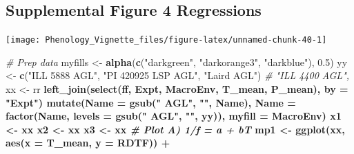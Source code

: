 \documentclass[
]{article}
\newenvironment{Shaded}{\begin{snugshade}}{\end{snugshade}}
\newcommand{\CommentTok}[1]{\textcolor[rgb]{0.56,0.35,0.01}{\textit{#1}}}
\newcommand{\DataTypeTok}[1]{\textcolor[rgb]{0.13,0.29,0.53}{#1}}
\newcommand{\FloatTok}[1]{\textcolor[rgb]{0.00,0.00,0.81}{#1}}
\newcommand{\KeywordTok}[1]{\textcolor[rgb]{0.13,0.29,0.53}{\textbf{#1}}}
\newcommand{\NormalTok}[1]{#1}
\newcommand{\OperatorTok}[1]{\textcolor[rgb]{0.81,0.36,0.00}{\textbf{#1}}}
\newcommand{\StringTok}[1]{\textcolor[rgb]{0.31,0.60,0.02}{#1}}
\begin{document}
\hypertarget{supplemental-figure-4-regressions}{%
\subsection{Supplemental Figure 4
Regressions}\label{supplemental-figure-4-regressions}}

\texttt{[image: Phenology\_Vignette\_files/figure-latex/unnamed-chunk-40-1]}

\begin{Shaded}
\begin{Highlighting}[]
\CommentTok{# Prep data}
\NormalTok{myfills <-}\StringTok{ }\KeywordTok{alpha}\NormalTok{(}\KeywordTok{c}\NormalTok{(}\StringTok{"darkgreen"}\NormalTok{, }\StringTok{"darkorange3"}\NormalTok{, }\StringTok{"darkblue"}\NormalTok{), }\FloatTok{0.5}\NormalTok{)}
\NormalTok{yy <-}\StringTok{ }\KeywordTok{c}\NormalTok{(}\StringTok{"ILL 5888 AGL"}\NormalTok{, }\StringTok{"PI 420925 LSP AGL"}\NormalTok{,  }\StringTok{"Laird AGL"}\NormalTok{) }\CommentTok{# "ILL 4400 AGL",}
\NormalTok{xx <-}\StringTok{ }\NormalTok{rr }\OperatorTok{%
\StringTok{  }\KeywordTok{left_join}\NormalTok{(}\KeywordTok{select}\NormalTok{(ff, Expt, MacroEnv, T_mean, P_mean), }\DataTypeTok{by =} \StringTok{"Expt"}\NormalTok{) }\OperatorTok{%
\StringTok{  }\KeywordTok{mutate}\NormalTok{(}\DataTypeTok{Name =} \KeywordTok{gsub}\NormalTok{(}\StringTok{" AGL"}\NormalTok{, }\StringTok{""}\NormalTok{, Name),}
         \DataTypeTok{Name =} \KeywordTok{factor}\NormalTok{(Name, }\DataTypeTok{levels =} \KeywordTok{gsub}\NormalTok{(}\StringTok{" AGL"}\NormalTok{, }\StringTok{""}\NormalTok{, yy)),}
         \DataTypeTok{myfill =}\NormalTok{ MacroEnv)}
\NormalTok{x1 <-}\StringTok{ }\NormalTok{xx }\OperatorTok{%
\NormalTok{x2 <-}\StringTok{ }\NormalTok{xx }\OperatorTok{%
\NormalTok{x3 <-}\StringTok{ }\NormalTok{xx }\OperatorTok{%
\CommentTok{# Plot A) 1/f = a + bT}
\NormalTok{mp1 <-}\StringTok{ }\KeywordTok{ggplot}\NormalTok{(xx, }\KeywordTok{aes}\NormalTok{(}\DataTypeTok{x =}\NormalTok{ T_mean, }\DataTypeTok{y =}\NormalTok{ RDTF)) }\OperatorTok{+}
}}}}}
\end{Highlighting}
\end{Shaded}
\end{document}
